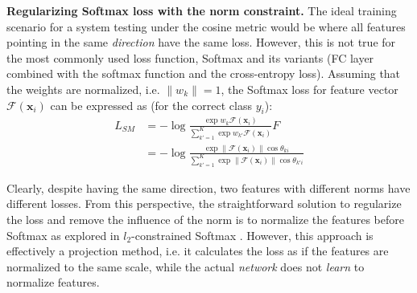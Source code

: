 \documentclass[10pt,twocolumn,letterpaper]{article}
\begin{document}

\textbf{ Regularizing Softmax loss with the norm constraint.}
The ideal training scenario for a system testing under the cosine metric would be where all features pointing in the same \textit{direction} have the same loss. However, this is not true for the most commonly used loss function, Softmax and its variants (FC layer combined with the softmax function and the cross-entropy loss). Assuming that the weights are normalized, i.e. $\|w_k\|=1$, the Softmax loss for feature vector $\mathcal{F}(\mathbf{x}_i)$ can be expressed as (for the correct class $y_i$):
\begin{align}
L_{SM} &= -\log{
 \frac{
  \exp{w_k \mathcal{F}(\mathbf{x}_i)}}
  {
  \sum_{{k'}=1}^K 
   {\exp{w_{k'} \mathcal{F}(\mathbf{x}_i)}}
  }F
 }\\
 &= -\log{
 \frac{
  \exp{\|\mathcal{F}(\mathbf{x}_i)\|\cos{\theta_{ki}}}}
  {
  \sum_{{k'}=1}^K 
   {\exp{\|\mathcal{F}(\mathbf{x}_i)\|\cos{\theta_{k'i}}}}
  }
 }
\end{align}

Clearly, despite having the same direction, two features with different norms have different losses. From this perspective, the straightforward solution to regularize the loss and remove the influence of the norm is to normalize the features before Softmax as explored in $l_2$-constrained Softmax  \cite{ranjan2017l2}. However, this approach is effectively a projection method, i.e. it calculates the loss as if the features are normalized to the same scale, while the actual \textit{network} does not \textit{learn} to normalize features.
\end{document}
